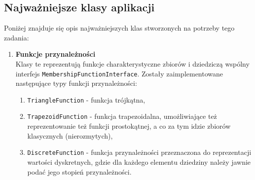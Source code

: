 \documentclass{classrep}
\begin{document}
\paragraph{}
\subsection{Najważniejsze klasy aplikacji}
Poniżej znajduje się opis najważniejszych klas stworzonych na potrzeby tego zadania:
\begin{enumerate}
\item \textbf{Funkcje przynależności}\\
Klasy te reprezentują funkcje charakterystyczne zbiorów i dziedziczą wspólny interfejs \verb|MembershipFunctionInterface|. Zostały zaimplementowane następujące typy funkcji przynależności:
\begin{enumerate}
\item \verb|TriangleFunction| - funkcja trójkątna,
\item \verb|TrapezoidFunction| - funkcja trapezoidalna, umożliwiające też reprezentowanie też funkcji prostokątnej, a co za tym idzie zbiorów klasycznych (nierozmytych),
\item \verb|DiscreteFunction| - funkcja przynależności przeznaczona do reprezentacji wartości dyskretnych, gdzie dla każdego elementu dziedziny należy jawnie podać jego stopień przynależności.
\end{enumerate}


\end{enumerate}
\end{document}

